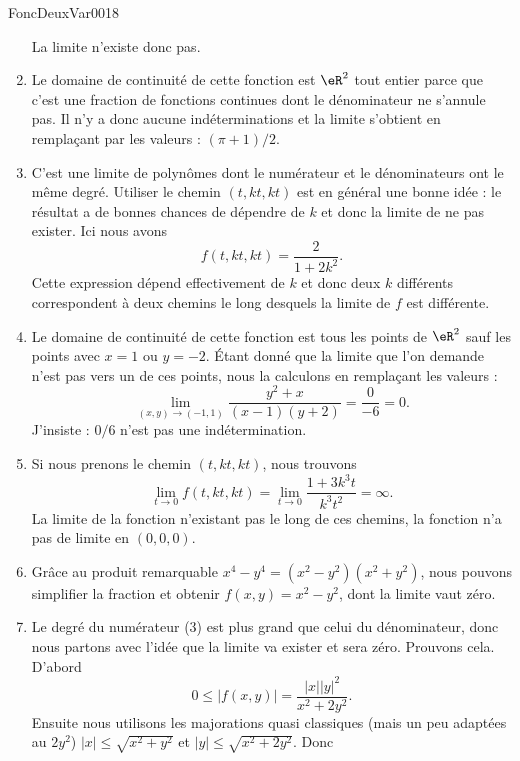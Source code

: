 \begin{corrige}{FoncDeuxVar0018}
\begin{enumerate}
			La limite n'existe donc pas.
		\item	%
			Le domaine de continuité de cette fonction est $\eR^2$ tout entier parce que c'est une fraction de fonctions continues dont le dénominateur ne s'annule pas. Il n'y a donc aucune indéterminations et la limite s'obtient en remplaçant par les valeurs : $(\pi+1)/2$.
		\item	%
			C'est une limite de polynômes dont le numérateur et le dénominateurs ont le même degré. Utiliser le chemin $(t,kt,kt)$ est en général une bonne idée : le résultat a de bonnes chances de dépendre de $k$ et donc la limite de ne pas exister. Ici nous avons
			\begin{equation}
				f(t,kt,kt)=\frac{ 2 }{ 1+2k^2 }.
			\end{equation}
			Cette expression dépend effectivement de $k$ et donc deux $k$ différents correspondent à deux chemins le long desquels la limite de $f$ est différente.
		\item	%
			Le domaine de continuité de cette fonction est tous les points de $\eR^2$ sauf les points avec $x=1$ ou $y=-2$. Étant donné que la limite que l'on demande n'est pas vers un de ces points, nous la calculons en remplaçant les valeurs :
			\begin{equation}
				\lim_{(x,y)\to(-1,1)}\frac{ y^2+x }{ (x-1)(y+2) }=\frac{ 0 }{ -6 }=0.
			\end{equation}
			J'insiste : $0/6$ n'est pas une indétermination.
		\item	%
			Si nous prenons le chemin $(t,kt,kt)$, nous trouvons
			\begin{equation}
				\lim_{t\to 0}f(t,kt,kt)=\lim_{t\to 0}\frac{ 1+3k^3t }{ k^3t^2 }=\infty.
			\end{equation}
			La limite de la fonction n'existant pas le long de ces chemins, la fonction n'a pas de limite en $(0,0,0)$.
		\item	%
			Grâce au produit remarquable $x^4-y^4=(x^2-y^2)(x^2+y^2)$, nous pouvons simplifier la fraction et obtenir $f(x,y)=x^2-y^2$, dont la limite vaut zéro.
		\item	%
			Le degré du numérateur ($3$) est plus grand que celui du dénominateur, donc nous partons avec l'idée que la limite va exister et sera zéro. Prouvons cela. D'abord
			\begin{equation}
				0\leq | f(x,y) |=\frac{ | x | |y |^2 }{ x^2+2y^2 }.
			\end{equation}
			Ensuite nous utilisons les majorations quasi classiques (mais un peu adaptées au $2y^2$) $| x |\leq\sqrt{x^2+y^2}$ et $| y |\leq \sqrt{x^2+2y^2}$. Donc

\end{enumerate}
\end{corrige}
